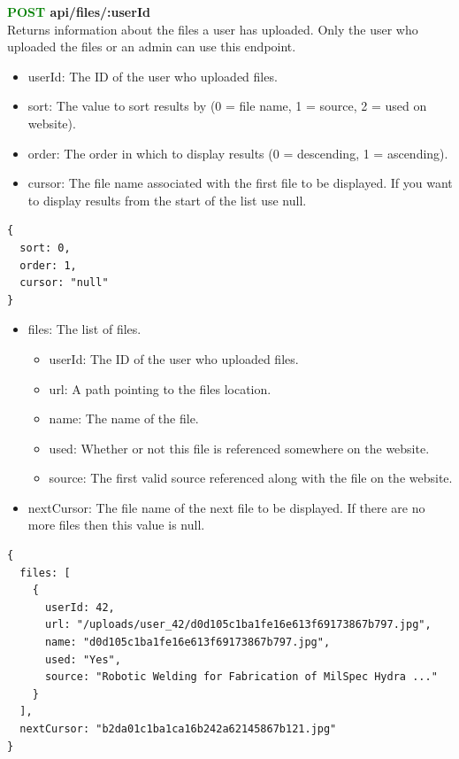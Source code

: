 \documentclass[onecolumn, draftclsnofoot,10pt, compsoc, usenames, dvipsnames]{IEEEtran}
\begin{document}
\noindent
\textbf{\textcolor{Green}{POST} api/files/:userId} \\
Returns information about the files a user has uploaded. Only the user who uploaded the files or an admin can use this endpoint.
\begin{itemize}
    \item userId: The ID of the user who uploaded files.
    \item sort: The value to sort results by (0 = file name, 1 = source, 2 = used on website).
    \item order: The order in which to display results (0 = descending, 1 = ascending).
    \item cursor: The file name associated with the first file to be displayed. If you want to display results from the start of the list use null.
\end{itemize}
\begin{lstlisting}[caption=Example Request Body]
{
  sort: 0,
  order: 1,
  cursor: "null"
}
\end{lstlisting}
\begin{itemize}
    \item files: The list of files.
    \begin{itemize}
    \item userId: The ID of the user who uploaded files.
    \item url: A path pointing to the files location.
    \item name: The name of the file.
    \item used: Whether or not this file is referenced somewhere on the website.
    \item source: The first valid source referenced along with the file on the website.
    \end{itemize}
    \item nextCursor: The file name of the next file to be displayed. If there are no more files then this value is null.
\end{itemize}
\begin{lstlisting}[caption=Example Response]
{
  files: [
    {
      userId: 42,
      url: "/uploads/user_42/d0d105c1ba1fe16e613f69173867b797.jpg",
      name: "d0d105c1ba1fe16e613f69173867b797.jpg",
      used: "Yes",
      source: "Robotic Welding for Fabrication of MilSpec Hydra ..."
    }
  ],
  nextCursor: "b2da01c1ba1ca16b242a62145867b121.jpg"
}
\end{lstlisting}
\\~\\
\end{document}
